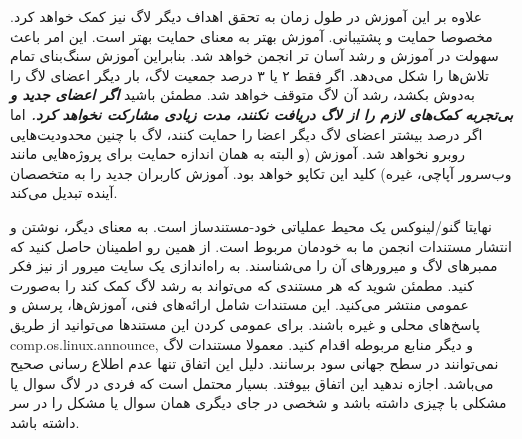 علاوه بر این آموزش در طول زمان به تحقق اهداف دیگر لاگ نیز کمک خواهد کرد.
مخصوصا حمایت و پشتیبانی. آموزش بهتر به معنای حمایت بهتر است.
این امر باعث سهولت در آموزش و رشد آسان تر انجمن خواهد شد.
بنابراین آموزش سنگ‌بنای تمام تلاش‌ها را شکل می‌دهد.
اگر فقط ۲ یا ۳ درصد جمعیت لاگ، بار دیگر اعضای لاگ را به‌دوش بکشد،
رشد آن لاگ متوقف خواهد شد. مطمئن باشید
{\bfseries {\itshape
اگر اعضای جدید و بی‌تجربه کمک‌های لازم را از لاگ دریافت نکنند، مدت زیادی مشارکت نخواهد کرد.
}}
اما اگر درصد بیشتر اعضای لاگ دیگر اعضا را حمایت کنند، لاگ با چنین محدودیت‌هایی روبرو نخواهد شد.
آموزش (و البته به همان اندازه حمایت برای پروژه‌هایی مانند وب‌سرور آپاچی،
 غیره) کلید این تکاپو خواهد بود. آموزش کاربران جدید را به متخصصان آینده تبدیل می‌کند.

نهایتا گنو/لینوکس یک محیط عملیاتی خود-مستندساز است.
به معنای دیگر، نوشتن و انتشار مستندات انجمن ما به خودمان مربوط است.
از همین رو اطمینان حاصل کنید که ممبر‌های لاگ
و میرورهای آن را می‌شناسند.
به راه‌اندازی یک سایت میرور از  نیز فکر کنید.
مطمئن شوید که هر مستندی که می‌تواند به رشد لاگ کمک کند را
به‌صورت عمومی منتشر می‌کنید. این مستندات شامل ارائه‌های فنی، آموزش‌ها،
پرسش و پاسخ‌های محلی و غیره باشند. برای عمومی کردن این مستندها می‌توانید
از طریق
{\ttfamily comp.os.linux.announce}, 
و دیگر منابع مربوطه اقدام کنید.
معمولا مستندات لاگ نمی‌توانند در سطح جهانی سود برسانند. دلیل این اتفاق
تنها عدم اطلاع رسانی صحیح می‌باشد. اجازه ندهید این اتفاق بیوفتد.
بسیار محتمل است که فردی در لاگ سوال یا مشکلی با چیزی داشته باشد
و شخصی در جای دیگری همان سوال یا مشکل را در سر داشته باشد.
 
